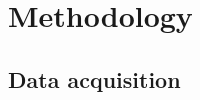 \documentclass[a4paper,11pt]{article}
\begin{document}











\section{Methodology}


\subsection{Data acquisition}
\end{document}

